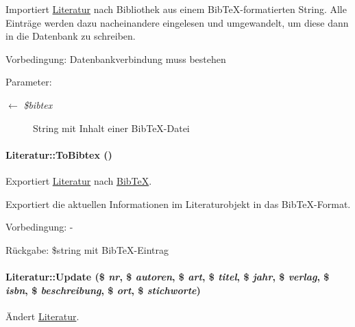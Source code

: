 Importiert \hyperlink{classLiteratur}{Literatur} nach Bibliothek aus einem Bib\-Te\-X-formatierten String. Alle Einträge werden dazu nacheinandere eingelesen und umgewandelt, um diese dann in die Datenbank zu schreiben. \begin{Desc}
\item[Vorbedingung:]Datenbankverbindung muss bestehen \end{Desc}
\begin{Desc}
\item[Parameter:]
\begin{description}
\item[\mbox{$\leftarrow$} {\em \$bibtex}]String mit Inhalt einer Bib\-Te\-X-Datei\end{description}
\end{Desc}
\hypertarget{classLiteratur_11f6d1a4409c41638ff6693f65699ff3}{
\paragraph[ToBibtex]{\setlength{\rightskip}{0pt plus 5cm}Literatur::To\-Bibtex ()}\hfill}
\label{classLiteratur_11f6d1a4409c41638ff6693f65699ff3}


Exportiert \hyperlink{classLiteratur}{Literatur} nach \hyperlink{classBibTeX}{Bib\-Te\-X}. 

Exportiert die aktuellen Informationen im Literaturobjekt in das Bib\-Te\-X-Format. \begin{Desc}
\item[Vorbedingung:]- \end{Desc}
\begin{Desc}
\item[R\"{u}ckgabe:]\$string mit Bib\-Te\-X-Eintrag\end{Desc}
\hypertarget{classLiteratur_b613c28476ea28058f8fc2bccb57c923}{
\paragraph[Update]{\setlength{\rightskip}{0pt plus 5cm}Literatur::Update (\$ {\em nr}, \$ {\em autoren}, \$ {\em art}, \$ {\em titel}, \$ {\em jahr}, \$ {\em verlag}, \$ {\em isbn}, \$ {\em beschreibung}, \$ {\em ort}, \$ {\em stichworte})}\hfill}
\label{classLiteratur_b613c28476ea28058f8fc2bccb57c923}


Ändert \hyperlink{classLiteratur}{Literatur}. 

